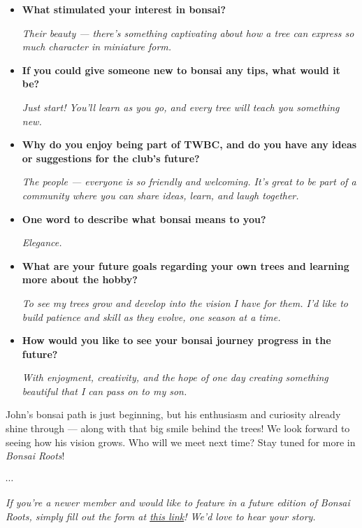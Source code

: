 \begin{itemize}
    \emph{I've admired bonsai all my life, but it's only recently that I've actually started growing and shaping trees of my own.}

    \item \textbf{What stimulated your interest in bonsai?}

    \emph{Their beauty — there's something captivating about how a tree can express so much character in miniature form.}

    \item \textbf{If you could give someone new to bonsai any tips, what would it be?}

    \emph{Just start! You'll learn as you go, and every tree will teach you something new.}

    \item \textbf{Why do you enjoy being part of TWBC, and do you have any ideas or suggestions for the club's future?}

    \emph{The people — everyone is so friendly and welcoming. It's great to be part of a community where you can share ideas, learn, and laugh together.}

    \item \textbf{One word to describe what bonsai means to you?}

    \emph{Elegance.}

    \item \textbf{What are your future goals regarding your own trees and learning more about the hobby?}

    \emph{To see my trees grow and develop into the vision I have for them. I'd like to build patience and skill as they evolve, one season at a time.}

    \item \textbf{How would you like to see your bonsai journey progress in the future?}

    \emph{With enjoyment, creativity, and the hope of one day creating something beautiful that I can pass on to my son.}
\end{itemize}

John's bonsai path is just beginning, but his enthusiasm and curiosity already shine through --- along with that big smile behind the trees!
We look forward to seeing how his vision grows.
Who will we meet next time?
Stay tuned for more in \emph{Bonsai Roots}!

\begin{center}
    $\cdots$
\end{center}

\noindent
\emph{If you're a newer member and would like to feature in a future edition of Bonsai Roots, simply fill out the form at \href{https://forms.gle/quVXa4L8rhpnT5kr6}{this link}! We'd love to hear your story.}
\closearticle
\columnbreak
